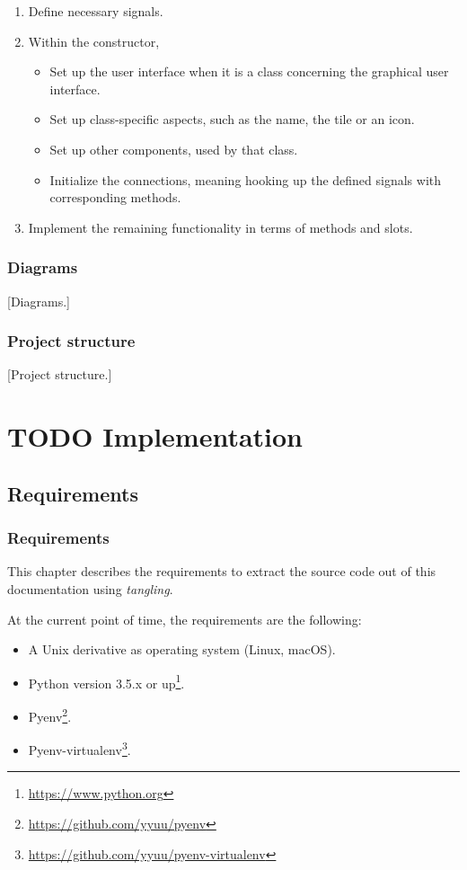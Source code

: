 \documentclass[10pt, openright, notitlepage]{scrreprt}
\begin{document}
\begin{enumerate}
\item Define necessary signals.
\item Within the constructor,
\begin{itemize}
\item Set up the user interface when it is a class concerning the graphical user
interface.
\item Set up class-specific aspects, such as the name, the tile or an icon.
\item Set up other components, used by that class.
\item Initialize the connections, meaning hooking up the defined signals with
corresponding methods.
\end{itemize}
\item Implement the remaining functionality in terms of methods and slots.
\end{enumerate}

\subsection{Diagrams}
\label{sec:org02f48bb}

[Diagrams.]

\subsection{Project structure}
\label{sec:org38111d2}

[Project structure.]
\chapter{{\bfseries\sffamily TODO} Implementation}
\label{sec:org3c2bb21}
\section{Requirements}
\label{sec:orgeaeebc9}
\subsection{Requirements}
\label{sec:org1dc849a}

This chapter describes the requirements to extract the source code out of this
documentation using \emph{tangling}.

At the current point of time, the requirements are the following:

\begin{itemize}
\item A Unix derivative as operating system (Linux, macOS).
\item Python version 3.5.x or up\footnote{\url{https://www.python.org}}.
\item Pyenv\footnote{\url{https://github.com/yyuu/pyenv}}.
\item Pyenv-virtualenv\footnote{\url{https://github.com/yyuu/pyenv-virtualenv}}.
\end{itemize}
\end{document}
